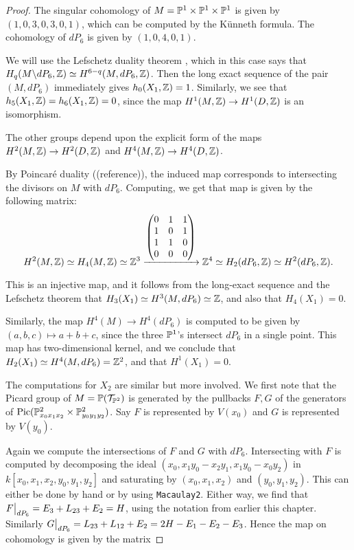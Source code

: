 \begin{proof}
The singular cohomology of $M=\mathbb{P}^1 \times \mathbb{P}^1 \times \mathbb{P}^1$ is given by $(1,0,3,0,3,0,1)$, which can be computed by the Künneth formula. The cohomology of $dP_6$ is given by $(1,0,4,0,1)$.

We will use the Lefschetz duality theorem \cite{spanier_topology}, which in this case says that $H_q(M \backslash dP_6, \mathbb{Z}) \simeq H^{6-q}(M,dP_6,\mathbb{Z})$. Then the long exact sequence of the pair $(M,dP_6)$ immediately gives $h_0(X_1,\mathbb{Z})=1$. Similarly, we see that $h_5(X_1,\mathbb{Z})=h_6(X_1,\mathbb{Z})=0$, since the map $H^1(M,\mathbb{Z}) \to H^1(D,\mathbb{Z})$ is an isomorphism.

The other groups depend upon the explicit form of the maps $H^2(M,\mathbb{Z}) \to H^2(D,\mathbb{Z})$ and $H^4(M,\mathbb{Z}) \to H^4(D,\mathbb{Z})$.

By Poincaré duality ((reference)), the induced map corresponds to intersecting the divisors on $M$ with $dP_6$. Computing, we get that map is given by the following matrix:
\[
H^2(M,\mathbb{Z}) \simeq H_4(M,\mathbb{Z}) \simeq \mathbb{Z}^3 \xrightarrow{
	\begin{pmatrix}
	0 & 1 & 1 \\
	1 & 0 & 1 \\
	1 & 1 & 0 \\
	0 & 0 & 0
	\end{pmatrix}
} \mathbb{Z}^4 \simeq H_2(dP_6,\mathbb{Z}) \simeq H^2(dP_6,\mathbb{Z}).
\]

This is an injective map, and it follows from the long-exact sequence and the Lefschetz theorem that $H_3(X_1) \simeq H^3(M,dP_6) \simeq \mathbb{Z}$, and also that $H_4(X_1)=0$.

Similarly, the map $H^4(M) \to H^4(dP_6)$ is computed to be given by $(a,b,c) \mapsto a+b+c$, since the three $\mathbb{P}^1$'s intersect $dP_6$ in a single point. This map has two-dimensional kernel, and we conclude that $H_2(X_1) \simeq H^4(M,dP_6) = \mathbb{Z}^2$, and that $H^1(X_1)=0$.

The computations for $X_2$ are similar but more involved. We first note that the Picard group of $M=\mathbb{P}(\mathcal T_{\mathbb{P}^2})$ is generated by the pullbacks $F,G$ of the generators of $\operatorname{Pic}(\mathbb{P}^2_{x_0x_1x_2} \times \mathbb{P}^2_{y_0y_1y_2})$. Say $F$ is represented by $V(x_0)$ and $G$ is represented by $V(y_0)$.

Again we compute the intersections of $F$ and $G$ with $dP_6$. Intersecting with $F$ is computed by decomposing the ideal $(x_0,x_1y_0-x_2y_1,x_1y_0-x_0y_2)$ in $k[x_0,x_1,x_2,y_0,y_1,y_2]$ and saturating by $(x_0,x_1,x_2)$ and $(y_0,y_1,y_2)$. This can either be done by hand or by using \texttt{Macaulay2}. Either way, we find that $\restr{F}{dP_6} = E_3+L_{23} + E_2=H$, using the notation from earlier this chapter. Similarly $\restr{G}{dP_6}=L_{23}+L_{12}+E_2=2H-E_1-E_2-E_3$. Hence the map on cohomology is given by the matrix


\end{proof}
